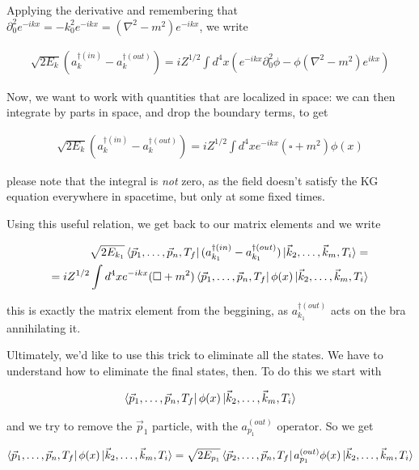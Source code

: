 \documentclass{report}
\begin{document}
Applying the derivative and remembering that \(\partial_0^2 e^{-ikx} = -k_0^2 e^{-ikx} = (\nabla^2 -m^2)e^{-ikx}\), we write 

\begin{align}
    \sqrt{2E_{k}}(a^{\dagger(in)}_k - a^{\dagger(out)}_k) = i Z^{1/2}\int d^4x (e^{-ikx}\partial_0^2\phi - \phi(\nabla^2-m^2)e^{ikx})
\end{align}

Now, we want to work with quantities that are localized in space: we can then integrate by parts in space, and drop the boundary terms, to get 

\begin{align}
    \sqrt{2E_{k}}(a^{\dagger(in)}_k - a^{\dagger(out)}_k) = iZ^{1/2}\int d^4x e^{-ikx}(\square +m^2)\phi(x)
\end{align}

please note that the integral is \emph{not} zero, as the field doesn't satisfy the KG equation everywhere in spacetime, but only at some fixed times. 

Using this useful relation, we get back to our matrix elements and we write 

\begin{align}
    \sqrt{2E_{k_1}}\bra{\vec{p}_1, \ldots, \vec{p}_n, T_f}(a^{\dagger(in)}_{k_1}- a^{\dagger(out)}_{k_1})\ket{\vec{k}_2, \ldots, \vec{k}_m, T_i} = \\
    = i Z^{1/2}\int d^4x e^{-ikx}(\square +m^2)\bra{\vec{p}_1, \ldots, \vec{p}_n, T_f}\phi(x)\ket{\vec{k}_2, \ldots, \vec{k}_m, T_i}
\end{align}

this is exactly the matrix element from the beggining, as \(a^{\dagger(out)}_{k_1}\) acts on the bra annihilating it. 

Ultimately, we'd like to use this trick to eliminate all the states. We have to understand how to eliminate the final states, then. To do this we start with 

\begin{align}
    \bra{\vec{p}_1, \ldots, \vec{p}_n, T_f}\phi(x)\ket{\vec{k}_2, \ldots, \vec{k}_m, T_i}
\end{align}

and we try to remove the \(\vec{p}_1\) particle, with the \(a_{p_1}^{(out)}\) operator. So we get 

\begin{align}
    \bra{\vec{p}_1, \ldots, \vec{p}_n, T_f}\phi(x)\ket{\vec{k}_2, \ldots, \vec{k}_m, T_i} = \sqrt{2E_{p_1}}\bra{\vec{p}_2, \ldots, \vec{p}_n, T_f}a_{p_1}^{(out)}\phi(x)\ket{\vec{k}_2, \ldots, \vec{k}_m, T_i}
\end{align}
\end{document}
